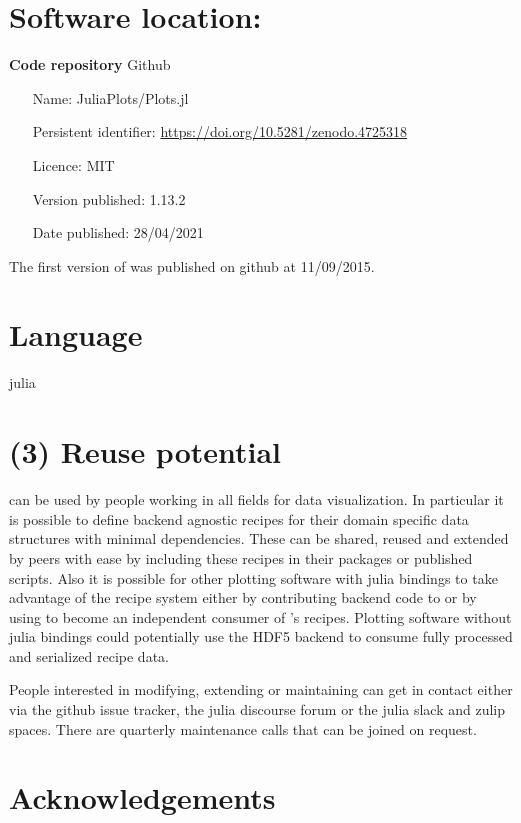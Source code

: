 \section*{Software location:}

{\bf Code repository} Github

\begin{itemize}[noitemsep,topsep=0pt]
	\item[Name:] JuliaPlots/Plots.jl
	\item[Persistent identifier:] \url{https://doi.org/10.5281/zenodo.4725318}
	\item[Licence:] MIT
        	\item[Version published:] 1.13.2
	\item[Date published:] 28/04/2021
\end{itemize}

The first version of \Plots was published on github at 11/09/2015.

\section*{Language}

julia

\section*{(3) Reuse potential}


\Plots can be used by people working in all fields for data visualization.
In particular it is possible to define backend agnostic recipes for their domain specific data structures with minimal dependencies.
These can be shared, reused and extended by peers with ease by including these recipes in their packages or published scripts.
Also it is possible for other plotting software with julia bindings to take advantage of the recipe system either by contributing backend code to \Plots or by using  to become an independent consumer of 's recipes.
Plotting software without julia bindings could potentially use the HDF5 backend to consume fully processed and serialized recipe data.

People interested in modifying, extending or maintaining \Plots can get in contact either via the github issue tracker, the julia discourse forum or the julia slack and zulip spaces.
There are quarterly maintenance calls that can be joined on request.

\section*{Acknowledgements}

